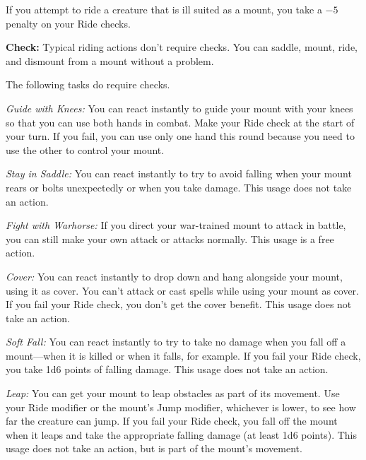 If you attempt to ride a creature that is ill suited as a mount, you take a $-5$ penalty on your Ride checks.

\textbf{Check:} Typical riding actions don’t require checks. You can saddle, mount, ride, and dismount from a mount without a problem.

The following tasks do require checks.


\textit{Guide with Knees:} You can react instantly to guide your mount with your knees so that you can use both hands in combat. Make your Ride check at the start of your turn. If you fail, you can use only one hand this round because you need to use the other to control your mount.

\textit{Stay in Saddle:} You can react instantly to try to avoid falling when your mount rears or bolts unexpectedly or when you take damage. This usage does not take an action.

\textit{Fight with Warhorse:} If you direct your war-trained mount to attack in battle, you can still make your own attack or attacks normally. This usage is a free action.

\textit{Cover:} You can react instantly to drop down and hang alongside your mount, using it as cover. You can’t attack or cast spells while using your mount as cover. If you fail your Ride check, you don’t get the cover benefit. This usage does not take an action.

\textit{Soft Fall:} You can react instantly to try to take no damage when you fall off a mount---when it is killed or when it falls, for example. If you fail your Ride check, you take 1d6 points of falling damage. This usage does not take an action.

\textit{Leap:} You can get your mount to leap obstacles as part of its movement. Use your Ride modifier or the mount’s Jump modifier, whichever is lower, to see how far the creature can jump. If you fail your Ride check, you fall off the mount when it leaps and take the appropriate falling damage (at least 1d6 points). This usage does not take an action, but is part of the mount’s movement.

